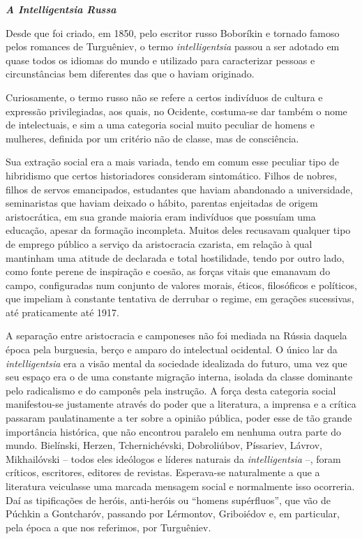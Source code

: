 \emph{\textbf{A Intelligentsia Russa}}

Desde que foi criado, em 1850, pelo escritor russo Boboríkin e tornado
famoso pelos romances de Turguêniev, o termo \emph{intelligentsia}
passou a ser adotado em quase todos os idiomas do mundo e utilizado para
caracterizar pessoas e circunstâncias bem diferentes das que o haviam
originado.

Curiosamente, o termo russo não se refere a certos indivíduos de cultura
e expressão privilegiadas, aos quais, no Ocidente, costuma-se dar também
o nome de intelectuais, e sim a uma categoria social muito peculiar de
homens e mulheres, definida por um critério não de classe, mas de
consciência.

Sua extração social era a mais variada, tendo em comum esse peculiar
tipo de hibridismo que certos historiadores consideram sintomático.
Filhos de nobres, filhos de servos emancipados, estudantes que haviam
abandonado a universidade, seminaristas que haviam deixado o hábito,
parentas enjeitadas de origem aristocrática, em sua grande maioria eram
indivíduos que possuíam uma educação, apesar da formação incompleta.
Muitos deles recusavam qualquer tipo de emprego público a serviço da
aristocracia czarista, em relação à qual mantinham uma atitude de
declarada e total hostilidade, tendo por outro lado, como fonte perene
de inspiração e coesão, as forças vitais que emanavam do campo,
configuradas num conjunto de valores morais, éticos, filosóficos e
políticos, que impeliam à constante tentativa de derrubar o regime, em
gerações sucessivas, até praticamente até 1917.

A separação entre aristocracia e camponeses não foi mediada na Rússia
daquela época pela burguesia, berço e amparo do intelectual ocidental. O
único lar da \emph{intelligentsia} era a visão mental da sociedade
idealizada do futuro, uma vez que seu espaço era o de uma constante
migração interna, isolada da classe dominante pelo radicalismo e do
camponês pela instrução. A força desta categoria social manifestou-se
justamente através do poder que a literatura, a imprensa e a crítica
passaram paulatinamente a ter sobre a opinião pública, poder esse de tão
grande importância histórica, que não encontrou paralelo em nenhuma
outra parte do mundo. Bielínski, Herzen, Tchernichévski, Dobroliúbov,
Píssariev, Lávrov, Mikhailóvski -- todos eles ideólogos e líderes
naturais da \emph{intelligentsia} --, foram críticos, escritores,
editores de revistas. Esperava-se naturalmente a que a literatura
veiculasse uma marcada mensagem social e normalmente isso ocorreria. Daí
as tipificações de heróis, anti-heróis ou ``homens supérfluos'', que vão
de Púchkin a Gontcharóv, passando por Lérmontov, Griboiédov e, em
particular, pela época a que nos referimos, por Turguêniev.

